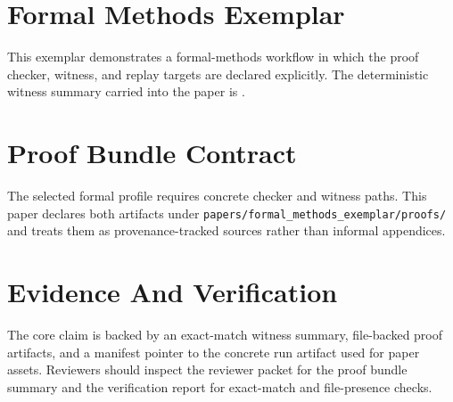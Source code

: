 \documentclass{article}
\begin{document}
\section*{Formal Methods Exemplar}

This exemplar demonstrates a formal-methods workflow in which the proof checker, witness, and replay targets are declared explicitly. The deterministic witness summary carried into the paper is \MetricMean.

\section*{Proof Bundle Contract}

The selected formal profile requires concrete checker and witness paths. This paper declares both artifacts under \texttt{papers/formal\_methods\_exemplar/proofs/} and treats them as provenance-tracked sources rather than informal appendices.

\section*{Evidence And Verification}

The core claim is backed by an exact-match witness summary, file-backed proof artifacts, and a manifest pointer to the concrete run artifact used for paper assets. Reviewers should inspect the reviewer packet for the proof bundle summary and the verification report for exact-match and file-presence checks.
\end{document}
